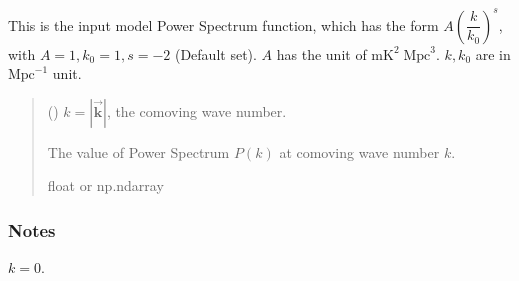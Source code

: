 \documentclass[a4paper,11pt,oneside,english,openany]{sphinxmanual}
\begin{document}

\begin{fulllineitems}
\label{\detokenize{simvis:simvis.ps}}
\pysigstartsignatures
{}
\pysigstopsignatures
\sphinxAtStartPar
This is the input model Power Spectrum function, which has the form \(A \left(\dfrac{k}{k_0}\right)^{s}\), with \(A=1, k_0=1, s=-2\) (Default set).
\(A\) has the unit of \(\text{mK}^2\;\text{Mpc}^3\). \(k, k_0\) are in \(\text{Mpc}^{-1}\) unit.
\begin{quote}\begin{description}
\sphinxAtStartPar
{} () \textendash{} \(k = |\vec{\mathbf{k}}|\), the comoving wave number.

\sphinxAtStartPar
The value of Power Spectrum \(P(k)\)  at comoving wave number \(k\).

\sphinxAtStartPar
float or np.ndarray

\end{description}\end{quote}
\subsubsection*{Notes}

\sphinxAtStartPar
{} \(k=0\).

\end{fulllineitems}

\end{document}
